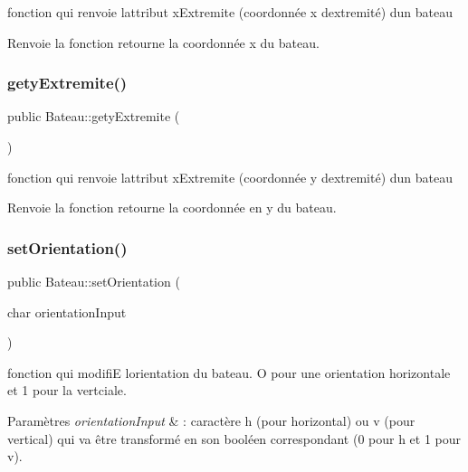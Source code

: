 fonction qui renvoie l\textquotesingle{}attribut x\+Extremite (coordonnée x d\textquotesingle{}extremité) d\textquotesingle{}un bateau 

\begin{DoxyReturn}{Renvoie}
la fonction retourne la coordonnée x du bateau. 
\end{DoxyReturn}
\mbox{\label{class_bateau_a326527275685c457dd95fd1a71924b21}} 
\subsubsection{\texorpdfstring{gety\+Extremite()}{getyExtremite()}}
{\footnotesize\ttfamily public Bateau\+::gety\+Extremite (\begin{DoxyParamCaption}{ }\end{DoxyParamCaption})}



fonction qui renvoie l\textquotesingle{}attribut x\+Extremite (coordonnée y d\textquotesingle{}extremité) d\textquotesingle{}un bateau 

\begin{DoxyReturn}{Renvoie}
la fonction retourne la coordonnée en y du bateau. 
\end{DoxyReturn}
\mbox{\label{class_bateau_a0c88ac8759c24674a23b7523cb3f6667}} 
\subsubsection{\texorpdfstring{set\+Orientation()}{setOrientation()}}
{\footnotesize\ttfamily public Bateau\+::set\+Orientation (\begin{DoxyParamCaption}\item[{char}]{orientation\+Input }\end{DoxyParamCaption})}



fonction qui modifiE l\textquotesingle{}orientation du bateau. O pour une orientation horizontale et 1 pour la vertciale. 


\begin{DoxyParams}{Paramètres}
{\em orientation\+Input} & \+: caractère h (pour horizontal) ou v (pour vertical) qui va être transformé en son booléen correspondant (0 pour h et 1 pour v). \\
\hline
\end{DoxyParams}
\mbox{\label{class_bateau_ac06303b2d1c9b2c9d6b29e6f65eaff26}} 
